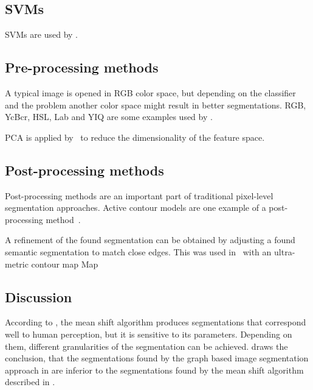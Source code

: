 \subsection{SVMs}\label{subsec:trad-SVM}%

\Glspl{SVM} are used by \cite{yang2012layered}.


\subsection{Pre-processing methods}\label{subsec:preprocessing-methods}%
A typical image is opened in RGB color space, but depending on the classifier
and the problem another color space might result in better segmentations. RGB,
YcBcr, HSL, Lab and YIQ are some examples used by \cite{cohen2015memory}.

\Gls{PCA} is applied by~\cite{chen2011pixel} to reduce the dimensionality of
the feature space.

\subsection{Post-processing methods}%
\label{subsec:post-processing-methods}%
Post-processing methods are an important part of traditional pixel-level
segmentation approaches. Active contour models are one example of a
post-processing method~\cite{kass1988snakes}.

A refinement of the found segmentation can be obtained by adjusting a found
semantic segmentation to match close edges. This was used
in~\cite{brox2011object} with an ultra-metric contour map
Map~\cite{arbelaez2009contours}


\subsection{Discussion}%
\label{subsec:traditional-approaches-discussion}%
According to \cite{pantofaru2005comparison}, the mean shift algorithm produces
segmentations that correspond well to human perception, but it is sensitive to
its parameters. Depending on them, different granularities of the segmentation
can be achieved. \cite{pantofaru2005comparison} draws the conclusion, that
the segmentations found by the graph based image segmentation approach
in \cite{felzenszwalb2004efficient} are inferior to the segmentations found
by the mean shift algorithm described in \cite{comaniciu2002mean}.
